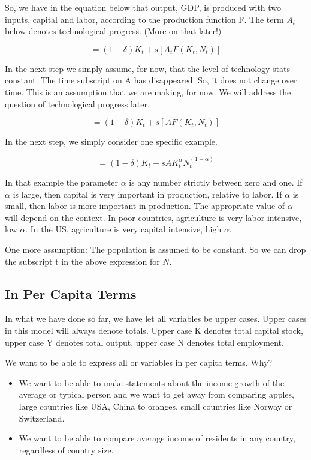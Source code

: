 \documentclass[
]{book}
\providecommand{\tightlist}{%
  \setlength{\itemsep}{0pt}\setlength{\parskip}{0pt}}
\begin{document}
So, we have in the equation below that output, GDP, is produced with two inputs, capital and labor, according to the production function F. The term \(A_t\) below denotes technological progress. (More on that later!)

\[=(1-δ) K_t+s[A_t F (K_t,N_t)]\]

In the next step we simply assume, for now, that the level of technology stats constant. The time subscript on A has disappeared. So, it does not change over time. This is an assumption that we are making, for now. We will address the question of technological progress later.

\[=(1-δ) K_t+s[A F (K_t,N_t)]\]

In the next step, we simply consider one specific example.

\[=(1-δ) K_t+s A K_t^\alpha N_t^{(1-\alpha)}\]

In that example the parameter \(\alpha\) is any number strictly between zero and one. If \(\alpha\) is large, then capital is very important in production, relative to labor. If \(\alpha\) is small, then labor is more important in production. The appropriate value of \(\alpha\) will depend on the context. In poor countries, agriculture is very labor intensive, low \(\alpha\). In the US, agriculture is very capital intensive, high \(\alpha\).

One more assumption: The population is assumed to be constant. So we can drop the subscript t in the above expression for \(N\).

\hypertarget{in-per-capita-terms}{%
\subsection{In Per Capita Terms}\label{in-per-capita-terms}}

In what we have done so far, we have let all variables be upper cases. Upper cases in this model will always denote totals. Upper case K denotes total capital stock, upper case Y denotes total output, upper case N denotes total employment.

We want to be able to express all or variables in per capita terms. Why?

\begin{itemize}
\tightlist
\item
  We want to be able to make statements about the income growth of the average or typical person and we want to get away from comparing apples, large countries like USA, China to oranges, small countries like Norway or Switzerland.
\item
  We want to be able to compare average income of residents in any country, regardless of country size.
\end{itemize}
\end{document}
